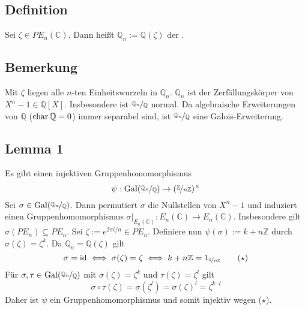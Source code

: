 \subsection[Definition: $n$-ter Kreisteilungskörper]{Definition} %
\label{sub:198}
Sei $\zeta \in PE_n(\mathds{C})$. Dann heißt $\mathds{Q}_n := \mathds{Q}(\zeta)$ der .

\subsection[Bemerkung: Eigenschaften des $n$-ten Kreisteilungskörpers]{Bemerkung} %
\label{sub:199}
Mit $\zeta$ liegen alle $n$-ten Einheitswurzeln in $\mathds{Q}_n$.
$\mathds{Q}_n$ ist der Zerfällungskörper von $X^n-1 \in \mathds{Q}[X]$. Insbesondere ist $\nicefrac{\mathds{Q}_n}{\mathds{Q}}$ normal. Da algebraische Erweiterungen von 
$\mathds{Q}$ ($\Char \mathds{Q}=0$) immer separabel sind, ist $\nicefrac{\mathds{Q}_n}{\mathds{Q}}$ eine Galois-Erweiterung.

\subsection[Lemma 1: Es ex. ein injektiver Gruppenhomomorphismus $\Gal(\nicefrac{\mathds{Q}_n}{\mathds{Q}})\to\enbrace{\nicefrac{\mathds{Z}}{n\mathds{Z}}}^\times$]{Lemma 1} %
\label{sub:1910}
Es gibt einen injektiven Gruppenhomomorphismus
\[
	\psi : \Gal( \nicefrac{\mathds{Q}_n}{\mathds{Q}}) \to \enbrace{\nicefrac{\mathds{Z}}{n \mathds{Z}}}^\times 
\]
Sei $\sigma \in \Gal \enbrace{\nicefrac{\mathds{Q}_n}{\mathds{Q}}} $. Dann permutiert $\sigma$ die Nullstellen von $X^n-1$ und induziert einen Gruppenhomomorphismus 
$\sigma|_{E_n(\mathds{C})} : E_n(\mathds{C}) \to E_n(\mathds{C})$. Insbesondere gilt $\sigma(PE_n)  \subseteq PE_n$. Sei $\zeta := e^{2 \pi  i/n} \in PE_n$. Definiere nun 
$\psi (\sigma) := k+ n \mathds{Z}$ durch
$\sigma(\zeta) = \zeta^k$. Da $\mathds{Q}_n = \mathds{Q}(\zeta)$ gilt
\[
	\sigma = \id \iff  \sigma(\zeta) = \zeta \iff k+ n \mathds{Z}  = 1_{\nicefrac{\mathds{Z}}{n \mathds{Z}}} \tag{$\star$}
\]
Für $\sigma, \tau \in \Gal(\nicefrac{\mathds{Q}_n}{\mathds{Q}})$ mit $\sigma(\zeta) = \zeta^k$ und $\tau (\zeta) = \zeta^l$ gilt
\[
	\sigma \circ \tau(\zeta) = \sigma (\zeta^l) = \sigma(\zeta)^l = \zeta^{k \cdot l}
\]
Daher ist $\psi$ ein Gruppenhomomorphismus und somit injektiv wegen ($\star$). \bewende

